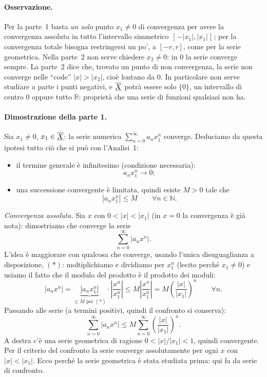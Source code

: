 \paragraph{Osservazione.}
Per la parte~1 basta \emph{un solo} punto $x_1\neq0$ di convergenza per avere la
convergenza assoluta in tutto l'intervallo simmetrico
$\mathopen{]}-|x_1|,|x_1|\mathclose{[}$; per la convergenza totale bisogna
restringersi un po', a $[-r,r]$, come per la serie geometrica.
Nella parte~2 non serve chiedere $x_2\neq0$: in $0$ la serie converge sempre.
La parte~2 dice che, trovato un punto di non convergenza, la serie non converge
nelle ``code'' $|x|>|x_2|$, cioè lontano da $0$.
In particolare non serve studiare a parte i punti negativi, e $\overline{\underline{X}}$ potrà essere
solo $\{0\}$, un intervallo di centro $0$ oppure tutto $\mathbb{R}$: proprietà
che una serie di funzioni qualsiasi non ha.

\paragraph{Dimostrazione della parte 1.} Sia $x_1\neq0$, $x_1\in \overline{\underline{X}}$: la serie
numerica $\sum_{n=0}^{\infty}a_nx_1^n$ converge.
Deduciamo da questa ipotesi tutto ciò che si può con l'Analisi~1:
\begin{itemize}
  \item il termine generale è infinitesimo (condizione necessaria):
  \[
    a_nx_1^n\to0 ;
  \]
  \item %
  una successione convergente è limitata, quindi esiste $M>0$ tale che
  \begin{equation}\tag{$*$}
    |a_nx_1^n|\le M\qquad\forall n\in\mathbb{N}.
  \end{equation}
\end{itemize}

\emph{Convergenza assoluta.} Sia $x$ con $0<|x|<|x_1|$ (in $x=0$ la convergenza
è già nota): dimostriamo che converge la serie
\[
  \sum_{n=0}^{\infty}|a_nx^n| .
\]
L'idea è maggiorare con qualcosa che converge, usando l'unica disuguaglianza a
disposizione, $(*)$: moltiplichiamo e dividiamo per $x_1^n$ (lecito perché
$x_1\neq0$) e usiamo il fatto che il modulo del prodotto è il prodotto dei
moduli:
\begin{equation}\tag{$**$}
  |a_nx^n|=\underbrace{|a_nx_1^n|}_{\le M\text{ per }(*)}\cdot\left|\frac{x^n}{x_1^n}\right|
  \le M\left|\frac{x^n}{x_1^n}\right|=M\left(\frac{|x|}{|x_1|}\right)^{n}
  \qquad\forall n .
\end{equation}
Passando alle serie (a termini positivi, quindi il confronto si conserva):
\[
  \sum_{n=0}^{\infty}|a_nx^n|\le M\sum_{n=0}^{\infty}\left(\frac{|x|}{|x_1|}\right)^{n}.
\]
A destra c'è una serie geometrica di ragione $0<|x|/|x_1|<1$, quindi
convergente. Per il criterio del confronto la serie converge assolutamente per
ogni $x$ con $|x|<|x_1|$.
Ecco perché la serie geometrica è stata studiata prima: qui fa da serie di
confronto.

